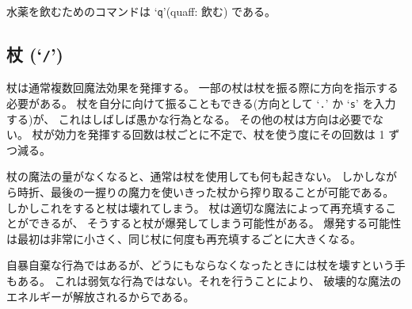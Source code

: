水薬を飲むためのコマンドは `{\tt q}'(quaff: 飲む) である。

\subsection*{杖 (`{\tt /}')}

杖は通常複数回魔法効果を発揮する。
一部の杖は杖を振る際に方向を指示する必要がある。
杖を自分に向けて振ることもできる(方向として `{\tt .}' か `{\tt s}' を入力する)が、
これはしばしば愚かな行為となる。
その他の杖は方向は必要でない。
杖が効力を発揮する回数は杖ごとに不定で、杖を使う度にその回数は 1 ずつ減る。

杖の魔法の量がなくなると、通常は杖を使用しても何も起きない。
しかしながら時折、最後の一握りの魔力を使いきった杖から搾り取ることが可能である。
しかしこれをすると杖は壊れてしまう。
杖は適切な魔法によって再充填することができるが、
そうすると杖が爆発してしまう可能性がある。
爆発する可能性は最初は非常に小さく、同じ杖に何度も再充填するごとに大きくなる。

自暴自棄な行為ではあるが、どうにもならなくなったときには杖を壊すという手もある。
これは弱気な行為ではない。それを行うことにより、
破壊的な魔法のエネルギーが解放されるからである。

